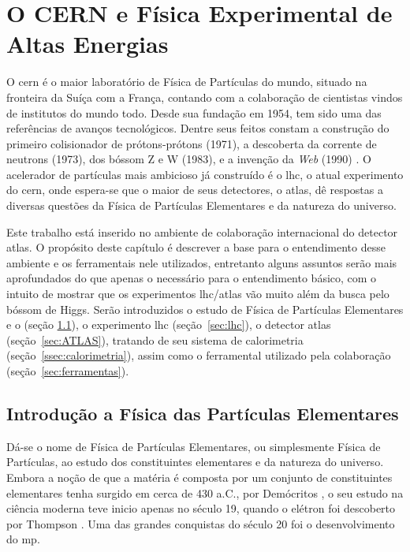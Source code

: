 \chapter{O CERN e Física Experimental de Altas Energias}
\glsresetall

O \gls{cern} é o maior
laboratório de Física de Partículas do mundo, situado na fronteira da Suíça com
a França, contando com a colaboração de cientistas vindos de institutos
do mundo todo. Desde sua fundação em 1954, tem sido uma das referências de
avanços tecnológicos. Dentre seus feitos constam a construção do primeiro 
colisionador de prótons-prótons (1971), a descoberta 
da corrente de neutrons (1973), dos bóssom Z e W (1983), 
e a invenção da \emph{Web} (1990) \cite{webCERN}. O acelerador de partículas mais ambicioso 
\cite{Intro_Standard,Beiser} já construído é o \gls{lhc}, o atual experimento do
\gls{cern}, onde espera-se que o maior de seus 
detectores, o \gls{atlas}, dê respostas a diversas questões da Física de Partículas
Elementares e da natureza do universo.

Este trabalho está inserido no ambiente de colaboração internacional do detector
\gls{atlas}. O propósito deste capítulo é descrever a base para o entendimento desse ambiente
e os ferramentais nele utilizados, entretanto alguns assuntos serão mais
aprofundados do que apenas o necessário para o entendimento básico, com o
intuito de mostrar que os experimentos \gls{lhc}/\gls{atlas} vão muito além 
da busca pelo bóssom de Higgs. Serão introduzidos o estudo de Física de Partículas
Elementares e o  (seção \ref{sec:fis_part}), 
o experimento \gls{lhc} (seção~\ref{sec:lhc}), o detector
\gls{atlas} (seção~\ref{sec:ATLAS}), tratando de seu sistema de calorimetria
(seção~\ref{ssec:calorimetria}), assim como o ferramental utilizado pela colaboração
(seção~\ref{sec:ferramentas}). 

\section{Introdução a Física das Partículas Elementares}
\label{sec:fis_part}

Dá-se o nome de Física de Partículas Elementares, ou simplesmente Física de
Partículas, ao estudo dos constituintes
elementares e da natureza do universo. Embora a noção de que a matéria é
composta por um conjunto de constituintes elementares tenha surgido em cerca de
430 a.C., por Demócritos \cite{democritos}, o seu estudo na ciência moderna teve inicio apenas 
no século 19, quando o elétron foi descoberto por Thompson \cite{thompson}.
Uma das grandes conquistas do século 20 foi o desenvolvimento do \gls{mp}.  

